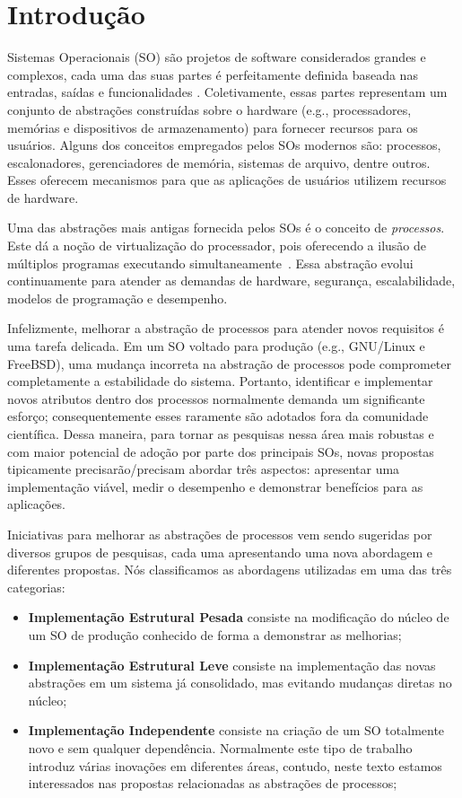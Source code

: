 \chapter{Introdução}
\label{cap:introducao}

Sistemas Operacionais (SO) são projetos de software considerados grandes e
complexos, cada uma das suas partes é perfeitamente definida baseada nas
entradas, saídas e funcionalidades \citep{silberschatz}. Coletivamente, essas
partes representam um conjunto de abstrações construídas sobre o hardware
(e.g., processadores, memórias e dispositivos de armazenamento) para fornecer
recursos para os usuários. Alguns dos conceitos empregados pelos SOs modernos
são: processos, escalonadores, gerenciadores de memória, sistemas de arquivo,
dentre outros.  Esses oferecem mecanismos para que as aplicações de usuários
utilizem recursos de hardware.

Uma das abstrações mais antigas fornecida pelos SOs é o conceito de
\textit{processos}. Este dá a noção de virtualização do processador, pois
oferecendo a ilusão de múltiplos programas executando
simultaneamente~\citep{love, tanenbaum}.  Essa abstração evolui continuamente
para atender as demandas de hardware, segurança, escalabilidade, modelos de
programação e desempenho.

Infelizmente, melhorar a abstração de processos para atender novos requisitos é
uma tarefa delicada. Em um SO voltado para produção (e.g., GNU/Linux e
FreeBSD), uma mudança incorreta na abstração de processos pode comprometer
completamente a estabilidade do sistema. Portanto, identificar e implementar
novos atributos dentro dos processos normalmente demanda um significante
esforço; consequentemente esses raramente são adotados fora da comunidade
científica. Dessa maneira, para tornar as pesquisas nessa área mais robustas e
com maior potencial de adoção por parte dos principais SOs, novas propostas
tipicamente precisarão/precisam abordar três aspectos: apresentar uma
implementação viável, medir o desempenho e demonstrar benefícios para as
aplicações.

Iniciativas para melhorar as abstrações de processos vem sendo sugeridas por
diversos grupos de pesquisas, cada uma apresentando uma nova abordagem e
diferentes propostas. Nós classificamos as abordagens utilizadas em uma das
três categorias:

\begin{itemize}
\item \textbf{Implementação Estrutural Pesada} consiste na modificação do núcleo
  de um SO de produção conhecido de forma a demonstrar as melhorias;
\item \textbf{Implementação Estrutural Leve} consiste na implementação das
  novas abstrações em um sistema já consolidado, mas evitando mudanças diretas
  no núcleo;
\item \textbf{Implementação Independente} consiste na criação de um SO
  totalmente novo e sem qualquer dependência. Normalmente este tipo de trabalho
  introduz várias inovações em diferentes áreas, contudo, neste texto estamos
  interessados nas propostas relacionadas as abstrações de processos;
\end{itemize}

